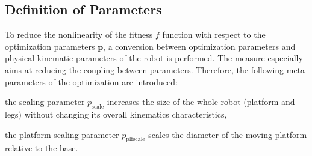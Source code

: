 \documentclass[fleqn,a4paper,10pt]{article}
\newcommand{\bm}[1]{\mathbf{#1}}
\begin{document}
\begin{multicols}{2}








\subsection{Definition of Parameters}
\label{sec:opt_params}

To reduce the nonlinearity of the fitness $f$ function with respect to the optimization parameters $\bm{p}$, a conversion between optimization parameters and physical kinematic parameters of the robot is performed.
The measure especially aims at reducing the coupling between parameters.
Therefore, the following meta-parameters of the optimization are introduced:
\begin{compactitem}
\item the scaling parameter $p_\mathrm{scale}$ increases the size of the whole robot (platform and legs) without changing its overall kinematics characteristics,%
\item the platform scaling parameter $p_\mathrm{plfscale}$ scales the diameter of the moving platform relative to the base.
\end{compactitem}


\end{multicols}
\end{document}
